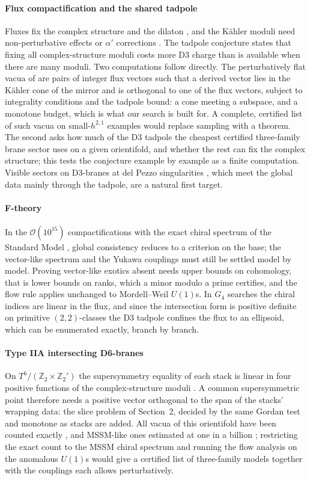 \documentclass[10pt,a4paper]{article}
\newcommand{\Z}{\mathbb{Z}}
\begin{document}
\paragraph{Flux compactification and the shared tadpole} Fluxes fix the complex
structure and the dilaton \cite{GKP02}, and the Kähler moduli need
non-perturbative effects \cite{KKLT03} or $\alpha'$ corrections
\cite{BBCQ05}. The tadpole conjecture \cite{BBGL20} states that
fixing all complex-structure moduli costs more D3 charge than is available when
there are many moduli. Two computations follow directly. The perturbatively flat
vacua of \cite{DKMM20} are pairs of integer flux vectors such that a derived
vector lies in the Kähler cone of the mirror and is orthogonal to one of the
flux vectors, subject to integrality conditions and the tadpole bound: a cone
meeting a subspace, and a monotone budget, which is what our search is built
for. A complete, certified list of
such vacua on small-$h^{2,1}$ examples would replace sampling with a theorem.
The second asks how much of the D3 tadpole the cheapest certified three-family
brane sector uses on a given orientifold, and whether the rest can fix the
complex structure; this tests the conjecture example by example as a finite
computation. Visible sectors on D3-branes at del Pezzo singularities
\cite{CKMQV12}, which meet the global data mainly through the tadpole, are a
natural first target.

\paragraph{F-theory} In the $\mathcal O(10^{15})$ compactifications with the
exact chiral spectrum of the Standard Model \cite{CHLLT19}, global consistency
reduces to a criterion on the base; the vector-like spectrum and the Yukawa
couplings must still be settled model by model. Proving vector-like exotics
absent needs upper bounds on cohomology, that is lower bounds on ranks, which a
minor modulo a prime certifies, and the flow rule applies unchanged to
Mordell--Weil $U(1)$s. In $G_4$ searches the chiral indices are linear in the
flux, and since the intersection form is positive definite on primitive
$(2,2)$-classes the D3 tadpole confines the flux to an ellipsoid, which can be
enumerated exactly, branch by branch.

\paragraph{Type IIA intersecting D6-branes} On $T^6/(\Z_2\times\Z_2')$ the
supersymmetry equality of each stack is linear in four positive functions of
the complex-structure moduli \cite{CSU01,BCLS05}. A common supersymmetric point
therefore needs a positive vector orthogonal to the span of the stacks' wrapping
data: the slice problem of Section~2, decided by the same Gordan test and
monotone as stacks are added. All vacua of this orientifold have been counted
exactly \cite{LS22}, and MSSM-like ones estimated at one in a billion
\cite{GBHLW06}; restricting the exact count to the MSSM chiral spectrum and
running the flow analysis on the anomalous $U(1)$s would give a certified list
of three-family models together with the couplings each allows perturbatively.
\end{document}
